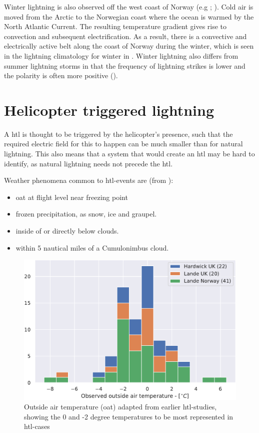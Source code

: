 Winter lightning is also observed off the west coast of Norway (e.g \cite{march2016}; \cite{koeltzow2018}). Cold air is moved from the Arctic to the Norwegian coast where the ocean is warmed by the North Atlantic Current. The resulting temperature gradient gives rise to convection and subsequent electrification. As a result, there is a convective and electrically active belt along the coast of Norway during the winter, which is seen in the lightning climatology for winter in \cite{koeltzow2018}. Winter lightning also differs from summer lightning storms in that the frequency of lightning strikes is lower and the polarity is often more positive (\cite{michimoto2007}).
 
\section{Helicopter triggered lightning}
A \acrlong{htl} is thought to be triggered by the helicopter's presence, such that the required electric field for this to happen can be much smaller than for natural lightning. This also means that a system that would create an \acrshort{htl} may be hard to identify, as natural lightning needs not precede the \acrshort{htl}. 

Weather phenomena common to \acrshort{htl}-events are (from \cite{lande1999}):
\begin{itemize}
 \item \acrfull{oat} at flight level near freezing point 
 \item frozen precipitation, as snow, ice and graupel.
 \item inside of or directly below clouds.
 \item within 5 nautical miles of a Cumulonimbus cloud.
\end{itemize}

\begin{figure}
    \centering
    \includegraphics[width=\textwidth]{Figures/LandeTemp.pdf}
    \caption{Outside air temperature (\acrshort{oat}) adapted from earlier \acrshort{htl}-studies, showing the 0 and -2 degree temperatures to be most represented in \acrshort{htl}-cases} 
    \label{fig:landetemp}
\end{figure}

